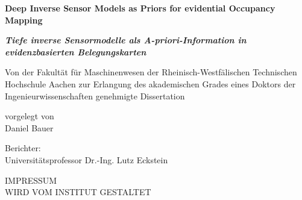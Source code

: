 {

\begin{titlepage}
  \centering
  \begin{minipage}[t]{9.8cm}
      \begin{center}
          {\large \textbf{Deep Inverse Sensor Models as Priors for evidential Occupancy Mapping}}
          \bigskip
      \end{center}
  \end{minipage}
  \begin{minipage}[t]{9.8cm}
      \begin{center}
          {\large \textcolor{ikagrey}{\textit{\textbf{Tiefe inverse Sensormodelle als A-priori-Information in evidenzbasierten Belegungskarten}}}}
          \bigskip
      \end{center}
  \end{minipage}
  \vfill
  \begin{minipage}[t]{16.5cm}
      \begin{center}
          Von der Fakultät für Maschinenwesen der
          Rheinisch-Westfälischen Technischen Hochschule Aachen
          zur Erlangung des akademischen Grades eines Doktors der
          Ingenieurwissenschaften genehmigte Dissertation
      \end{center}
  \end{minipage}
  \vfill
  \begin{minipage}[t]{9.8cm}
      \begin{center}
      	vorgelegt von\\
      	\vspace{\baselineskip}
          Daniel Bauer
      \end{center}
  \end{minipage}
\vfill
	\begin{minipage}[t]{9.8cm}
		\begin{center}
			Berichter:\\
			\vspace{\baselineskip}
			Universitätsprofessor Dr.-Ing. Lutz Eckstein
		\end{center}
	\end{minipage}
  \vfill
\end{titlepage}
\newpage
\pagestyle{empty}
\vspace{10cm}
\begin{center}
  IMPRESSUM\\
  \bigskip
  WIRD VOM INSTITUT GESTALTET
\end{center}
\vfill
\restoregeometry
}
